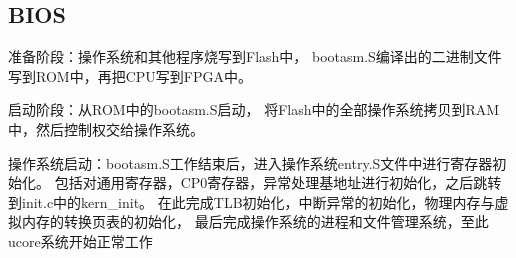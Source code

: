     \subsection{BIOS}
        准备阶段：操作系统和其他程序烧写到Flash中，%
        bootasm.S编译出的二进制文件写到ROM中，再把CPU写到FPGA中。

        启动阶段：从ROM中的bootasm.S启动，%
        将Flash中的全部操作系统拷贝到RAM中，然后控制权交给操作系统。

        操作系统启动：bootasm.S工作结束后，进入操作系统entry.S文件中进行寄存器初始化。
        包括对通用寄存器，CP0寄存器，异常处理基地址进行初始化，之后跳转到init.c中的kern\_init。
        在此完成TLB初始化，中断异常的初始化，物理内存与虚拟内存的转换页表的初始化，
        最后完成操作系统的进程和文件管理系统，至此ucore系统开始正常工作



